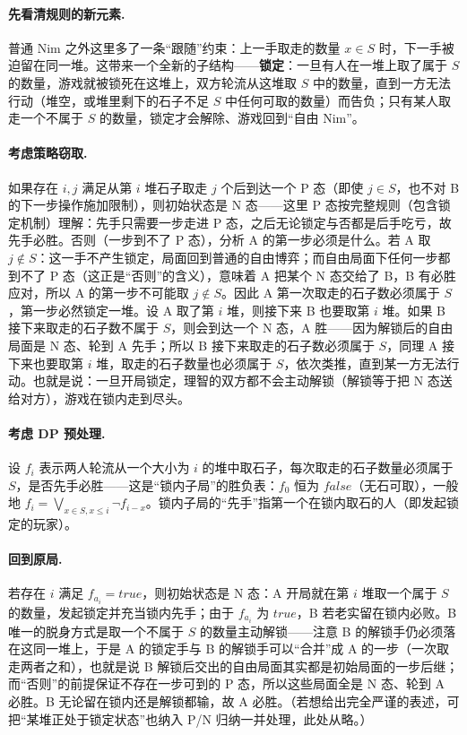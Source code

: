 \sol \paragraph{先看清规则的新元素.} 普通 Nim 之外这里多了一条“跟随”约束：上一手取走的数量 $x\in S$ 时，下一手被迫留在同一堆。这带来一个全新的子结构——\textbf{锁定}：一旦有人在一堆上取了属于 $S$ 的数量，游戏就被锁死在这堆上，双方轮流从这堆取 $S$ 中的数量，直到一方无法行动（堆空，或堆里剩下的石子不足 $S$ 中任何可取的数量）而告负；只有某人取走一个不属于 $S$ 的数量，锁定才会解除、游戏回到“自由 Nim”。

\paragraph{考虑策略窃取.} 如果存在 $i,j$ 满足从第 $i$ 堆石子取走 $j$ 个后到达一个 P 态（即使 $j\in S$，也不对 B 的下一步操作施加限制），则初始状态是 N 态——这里 P 态按完整规则（包含锁定机制）理解：先手只需要一步走进 P 态，之后无论锁定与否都是后手吃亏，故先手必胜。否则（一步到不了 P 态），分析 A 的第一步必须是什么。若 A 取 $j\notin S$：这一手不产生锁定，局面回到普通的自由博弈；而自由局面下任何一步都到不了 P 态（这正是“否则”的含义），意味着 A 把某个 N 态交给了 B，B 有必胜应对，所以 A 的第一步不可能取 $j\notin S$。因此 A 第一次取走的石子数必须属于 $S$，第一步必然锁定一堆。设 A 取了第 $i$ 堆，则接下来 B 也要取第 $i$ 堆。如果 B 接下来取走的石子数不属于 $S$，则会到达一个 N 态，A 胜——因为解锁后的自由局面是 N 态、轮到 A 先手；所以 B 接下来取走的石子数必须属于 $S$，同理 A 接下来也要取第 $i$ 堆，取走的石子数量也必须属于 $S$，依次类推，直到某一方无法行动。也就是说：一旦开局锁定，理智的双方都不会主动解锁（解锁等于把 N 态送给对方），游戏在锁内走到尽头。

\paragraph{考虑 DP 预处理.} 设 $f_i$ 表示两人轮流从一个大小为 $i$ 的堆中取石子，每次取走的石子数量必须属于 $S$，是否先手必胜——这是“锁内子局”的胜负表：$f_0$ 恒为 $false$（无石可取），一般地 $f_i=\bigvee_{x\in S,x\le i}\lnot f_{i-x}$。锁内子局的“先手”指第一个在锁内取石的人（即发起锁定的玩家）。

\paragraph{回到原局.} 若存在 $i$ 满足 $f_{a_i}=true$，则初始状态是 N 态：A 开局就在第 $i$ 堆取一个属于 $S$ 的数量，发起锁定并充当锁内先手；由于 $f_{a_i}$ 为 $true$，B 若老实留在锁内必败。B 唯一的脱身方式是取一个不属于 $S$ 的数量主动解锁——注意 B 的解锁手仍必须落在这同一堆上，于是 A 的锁定手与 B 的解锁手可以“合并”成 A 的一步（一次取走两者之和），也就是说 B 解锁后交出的自由局面其实都是初始局面的一步后继；而“否则”的前提保证不存在一步可到的 P 态，所以这些局面全是 N 态、轮到 A 必胜。B 无论留在锁内还是解锁都输，故 A 必胜。（若想给出完全严谨的表述，可把“某堆正处于锁定状态”也纳入 P/N 归纳一并处理，此处从略。）

